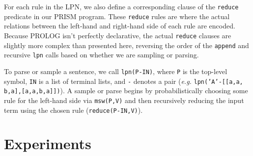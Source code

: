 \documentclass[11pt, twocolumn]{article}
\begin{document}
For each rule in the LPN, we also define a corresponding clause of the {\tt reduce} predicate in our PRISM program. These {\tt reduce} rules are where the actual relations between the left-hand and right-hand side of each rule are encoded. Because PROLOG isn't perfectly declarative, the actual {\tt reduce} clauses are slightly more complex than presented here, reversing the order of the {\tt append} and recursive {\tt lpn} calls based on whether we are sampling or parsing.

To parse or sample a sentence, we call {\tt lpn(P-IN)}, where {\tt P} is the top-level symbol, {\tt IN} is a list of terminal lists, and {\tt -} denotes a pair ({\it e.g.} {\tt lpn('A'-[[a,a,
b,a],[a,a,b,a]])}). A sample or parse begins by probabilistically choosing some rule for the left-hand side via {\tt msw(P,V)} and then recursively reducing the input term using the chosen rule ({\tt reduce(P-IN,V)}). 

\section{Experiments}
\end{document}
